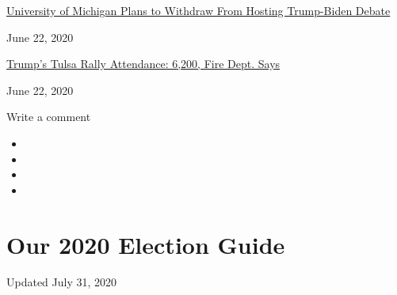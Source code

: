 \href{https://www.nytimes.com/2020/06/22/us/politics/trump-vs-biden-presidential-debates.html}{University
of Michigan Plans to Withdraw From Hosting Trump-Biden Debate}

June 22, 2020

\href{https://www.nytimes.com/2020/06/22/us/politics/trump-rally-coronavirus.html}{Trump's
Tulsa Rally Attendance: 6,200, Fire Dept. Says}

June 22, 2020

Write a comment

\begin{itemize}
\item
\item
\item
\item
\end{itemize}

\hypertarget{our-2020-election-guide}{%
\section{Our 2020 Election Guide}\label{our-2020-election-guide}}

Updated July 31, 2020


